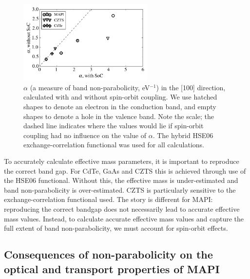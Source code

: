 \begin{figure}[tb] \centering
\includegraphics[width=0.6\textwidth]{./figures/ch4/alpha_SoC.png}
\caption[Band non-parabolicity and spin-orbit coupling]{\label{alpha_SoC}$\alpha$ (a measure of band non-parabolicity, eV$^{-1}$) in the [100] direction, calculated with and without spin-orbit coupling. We use hatched shapes to denote an electron in the conduction band, and empty shapes to denote a hole in the valence band. Note the scale; the dashed line indicates where the values would lie if spin-orbit coupling had no influence on the value of $\alpha$. The hybrid HSE06 exchange-correlation functional was used for all calculations. }
\end{figure}

To accurately calculate effective mass parameters, it is important to reproduce the correct band gap.
For CdTe, GaAs and CZTS this is achieved through use of the HSE06 functional.
Without this, the effective mass is under-estimated and band non-parabolicity is over-estimated.
CZTS is particularly sensitive to the exchange-correlation functional used.
The story is different for MAPI: 
reproducing the correct bandgap does not necessarily lead to accurate effective mass values.
Instead, to calculate accurate effective mass values and capture the full extent of band non-parabolicity, we must account for spin-orbit effects.

\subsection[Consequences of non-parabolicity on optical and transport properties]{Consequences of non-parabolicity on the optical and transport properties of MAPI}

